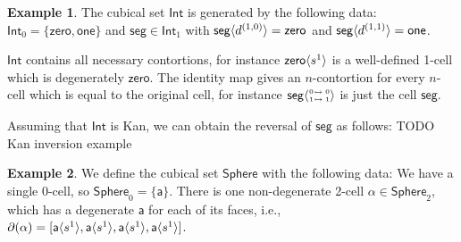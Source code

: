 \documentclass[11pt]{article}
\theoremstyle{definition}
\newtheorem{example}{Example}
\newcommand{\mlist}[1]{[ {#1} ]}
\newcommand{\smap}[1]{s^{{#1}}}
\newcommand{\dmap}[2]{d^{({#1} , {#2})}}
\newcommand{\cont}[2]{ \ifthenelse{\equal{#2}{}}{#1}{{#1}\langle{#2}\rangle} }
\newcommand{\cset}[1]{\mathsf{{#1}}}
\newcommand{\boundary}[1]{\partial({#1})}
\newcommand{\substtwo}[2]{\tiny
  \arraycolsep=.4pt\def\arraystretch{1}
  \begin{array}{ll}
    0 &\mapsto {#1} \\
    1 &\mapsto {#2}
  \end{array}
}
\newcommand{\oneid}{\substtwo{0}{1}}
\begin{document}
\begin{example}\label{exp:int}
  The cubical set $\cset{Int}$ is generated by the following data: $\cset{Int}_0
  = \{ \cset{zero} , \cset{one} \}$ and $\cset{seg} \in \cset{Int}_1$ with
  $\cont{\cset{seg}}{\dmap{1}{0}} = \cset{zero}$ and $\cont{\cset{seg}}{\dmap{1}{1}} =
  \cset{one}$.

  $\cset{Int}$ contains all necessary contortions, for instance
  $\cont{\cset{zero}}{\smap{1}}$ is a well-defined 1-cell which is
  degenerately $\cset{zero}$.
  The identity map gives an $n$-contortion for every $n$-cell which is equal
  to the original cell, for instance $\cont{\cset{seg}}{\oneid}$ is just the cell
  $\cset{seg}$.


  Assuming that $\cset{Int}$ is Kan, we can obtain the reversal of $\cset{seg}$
  as follows:
  TODO Kan inversion example
\end{example}

\begin{example}\label{exp:sndsphere}
  We define the cubical set $\cset{Sphere}$ with the following data: We have a
  single 0-cell, so $\cset{Sphere}_0 = \{
  \cset{a} \}$. There is one non-degenerate 2-cell $\cset{\alpha} \in
  \cset{Sphere}_2$, which has a degenerate $\cset{a}$ for each of its faces,
  i.e.,
  $\boundary{\cset{\alpha}} = \mlist{ \cont{\cset{a}}{\smap{1}},
    \cont{\cset{a}}{\smap{1}}, \cont{\cset{a}}{\smap{1}}, \cont{\cset{a}}{\smap{1}} }$.
\end{example}

\end{document}
